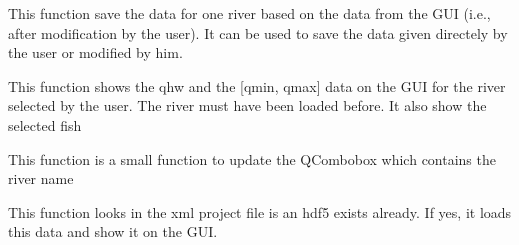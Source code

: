 \documentclass[letterpaper,10pt,english]{sphinxmanual}
\begin{document}
\begin{fulllineitems}
\begin{fulllineitems}
\end{fulllineitems}


\begin{fulllineitems}
\label{\detokenize{index:src_GUI.fstress_GUI.FstressW.save_river_data}}
This function save the data for one river based on the data from the GUI (i.e., after modification by the user).
It can be used to save the data given directely by the user or modified by him.

\end{fulllineitems}


\begin{fulllineitems}
\label{\detokenize{index:src_GUI.fstress_GUI.FstressW.show_data_one_river}}
This function shows the qhw and the {[}qmin, qmax{]} data on the GUI for the river selected by the user.
The river must have been loaded before. It also show the selected fish

\end{fulllineitems}


\begin{fulllineitems}
\label{\detokenize{index:src_GUI.fstress_GUI.FstressW.update_list_riv}}
This function is a small function to update the QCombobox which contains the river name

\end{fulllineitems}


\begin{fulllineitems}
\label{\detokenize{index:src_GUI.fstress_GUI.FstressW.was_loaded_before}}
This function looks in the xml project file is an hdf5 exists already. If yes, it loads this data
and show it on the GUI.

\end{fulllineitems}


\end{fulllineitems}
\end{document}
